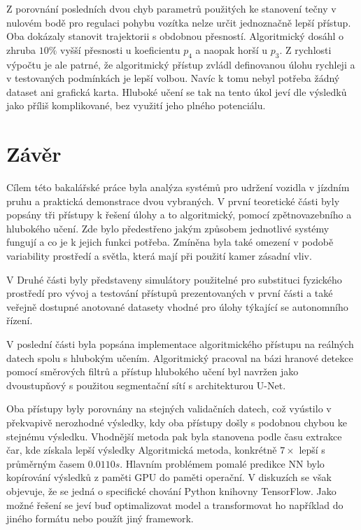 \documentclass[czech, bc, kky, he, iso690numb]{fasthesis}
\begin{document}
        	Z porovnání posledních dvou chyb parametrů použitých ke stanovení tečny v nulovém bodě pro regulaci pohybu vozítka nelze určit jednoznačně lepší přístup. Oba dokázaly stanovit trajektorii s obdobnou přesností. Algoritmický dosáhl o zhruba \(10\%\) vyšší přesnosti u koeficientu \(p_{4}\) a naopak horší u \(p_{3}\). Z rychlosti výpočtu je ale patrné, že algoritmický přístup zvládl definovanou úlohu rychleji a v testovaných podmínkách je lepší volbou. Navíc k tomu nebyl potřeba žádný dataset ani grafická karta. Hluboké učení se tak na tento úkol jeví dle výsledků jako příliš komplikované, bez využití jeho plného potenciálu.        		
    \chapter{Závěr}
        Cílem této bakalářské práce byla analýza systémů pro udržení vozidla v jízdním pruhu a praktická demonstrace dvou vybraných. V první teoretické části byly popsány tři přístupy k řešení úlohy a to algoritmický, pomocí zpětnovazebního a hlubokého učení. Zde bylo předestřeno jakým způsobem jednotlivé systémy fungují a co je k jejich funkci potřeba. Zmíněna byla také omezení v podobě variability prostředí a světla, která mají při použití kamer zásadní vliv.
        
        V Druhé části byly představeny simulátory použitelné pro substituci fyzického prostředí pro vývoj a testování přístupů prezentovaných v první části a také veřejně dostupné anotované datasety vhodné pro úlohy týkající se autonomního řízení.
        
        V poslední části byla popsána implementace algoritmického přístupu na reálných datech spolu s hlubokým učením. Algoritmický pracoval na bázi hranové detekce pomocí směrových filtrů a přístup hlubokého učení byl navržen jako dvoustupňový s použitou segmentační sítí s architekturou U-Net.
        
        Oba přístupy byly porovnány na stejných validačních datech, což vyústilo v překvapivě nerozhodné výsledky, kdy oba přístupy došly s podobnou chybou ke stejnému výsledku. Vhodnější metoda pak byla stanovena podle času extrakce čar, kde získala lepší výsledky Algoritmická metoda, konkrétně \(7\times\) lepší s průměrným časem \(0.0110 s\). Hlavním problémem pomalé predikce NN bylo kopírování výsledků z paměti GPU do paměti operační. V diskuzích se však objevuje, že se jedná o specifické chování Python knihovny TensorFlow. Jako možné řešení se jeví buď optimalizovat model a transformovat ho například do jiného formátu nebo použít jiný framework.
        
\end{document}

